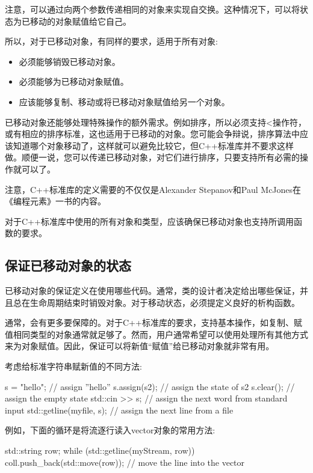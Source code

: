 注意，可以通过向两个参数传递相同的对象来实现自交换。这种情况下，可以将状态为已移动的对象赋值给它自己。

所以，对于已移动对象，有同样的要求，适用于所有对象:

\begin{itemize}
	\item 必须能够销毁已移动对象。
	\item 必须能够为已移动对象赋值。
	\item 应该能够复制、移动或将已移动对象赋值给另一个对象。
\end{itemize}

已移动对象还能够处理特殊操作的额外需求。例如排序，所以必须支持<操作符，或有相应的排序标准，这也适用于已移动的对象。您可能会争辩说，排序算法中应该知道哪个对象移动了，这样就可以避免比较它，但C++标准库并不要求这样做。顺便一说，您可以传递已移动对象，对它们进行排序，只要支持所有必需的操作就可以了。

注意，C++标准库的定义需要的不仅仅是Alexander Stepanov和Paul McJones在《编程元素》一书的内容。

对于C++标准库中使用的所有对象和类型，应该确保已移动对象也支持所调用函数的要求。

\subsection{保证已移动对象的状态}

已移动对象的保证定义在使用哪些代码。通常，类的设计者决定给出哪些保证，并且总在生命周期结束时销毁对象。对于移动状态，必须提定义良好的析构函数。

通常，会有更多要保障的。对于C++标准库的要求，支持基本操作，如复制、赋值相同类型的对象通常就足够了。然而，用户通常希望可以使用处理所有其他方式来为对象赋值。因此，保证可以将新值“赋值”给已移动对象就非常有用。

考虑给标准字符串赋新值的不同方法:

\begin{cppcode}
s = "hello"; // assign ”hello”
s.assign(s2); // assign the state of s2
s.clear(); // assign the empty state
std::cin >> s; // assign the next word from standard input
std::getline(myfile, s); // assign the next line from a file
\end{cppcode}

例如，下面的循环是将流逐行读入vector对象的常用方法:

\begin{cppcode}
std::string row;
while (std::getline(myStream, row)) {
	coll.push_back(std::move(row)); // move the line into the vector
}
\end{cppcode}

